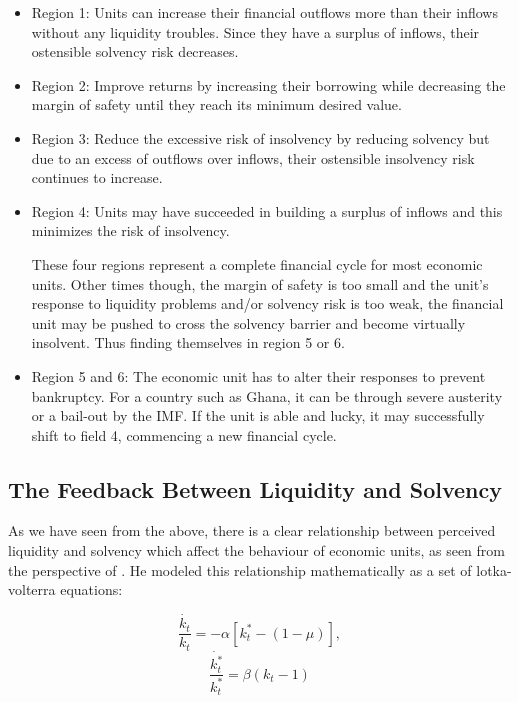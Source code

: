 \documentclass[a4paper, 12pt]{article}
\begin{document}
	\begin{itemize}
		\item Region 1: Units can increase their financial outflows more than their inflows without any liquidity troubles. Since they have a surplus of inflows, their ostensible solvency risk decreases.
		\item Region 2: Improve returns by increasing their borrowing while decreasing the margin of safety until they reach its minimum desired value.
		\item Region 3: Reduce the excessive risk of insolvency by reducing solvency but due to an excess of outflows over inflows, their ostensible insolvency risk continues to increase.
		\item Region 4: Units may have succeeded in building a surplus of inflows and this minimizes the risk of insolvency.
		
		These four regions represent a complete financial cycle for most economic units. Other times though, the margin of safety is too small and the unit's response to liquidity problems and/or solvency risk is too weak, the financial unit may be pushed to cross the solvency barrier and become virtually insolvent. Thus finding themselves in region 5 or 6.
		
		
		\item Region 5 and 6: The economic unit has to alter their responses to prevent bankruptcy. For a country such as Ghana, it can be through severe austerity or a bail-out by the IMF. If the unit is able and lucky, it may successfully shift to field 4, commencing a new financial cycle.
	\end{itemize}

	\subsection{The Feedback Between Liquidity and Solvency}
	As we have seen from the above, there is a clear relationship between perceived liquidity and solvency which affect the behaviour of economic units, as seen from the perspective of . He modeled this relationship mathematically as a set of lotka-volterra equations:
	
	\begin{equation}
	\frac{\dot{k_t}}{k_t} = -\alpha[k_t^* - (1 - \mu)],
	\end{equation}
	\begin{equation}
	\frac{\dot{k^*_t}}{k^*_t} = \beta(k_t - 1)
	\end{equation}
	
\end{document}
